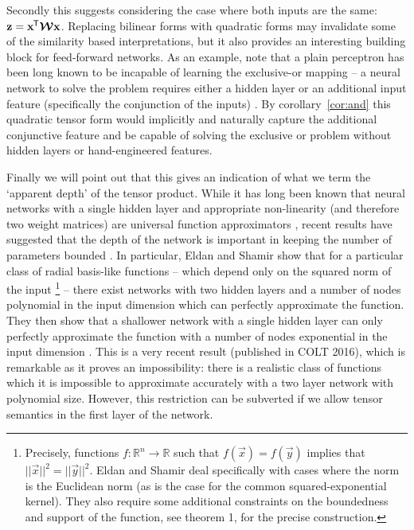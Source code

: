 Secondly this suggests considering
the case where both inputs are the same: \(\mathbf{z} = \mathbf{x}^{\mkern-1.5mu\mathsf{T}}\bm{\mathcal{W}}\mathbf{x}\). Replacing
bilinear forms with quadratic forms may invalidate some of the similarity based interpretations,
but it also provides an interesting building block for feed-forward networks. As an example,
note that a plain perceptron has been long known to be incapable of learning the exclusive-or
mapping \autocite{Minsky1969} -- a neural network to solve the problem requires either a hidden layer
or an additional input feature (specifically the conjunction of the inputs) \autocite{Rumelhart1986}.
By corollary~\ref{cor:and} this quadratic tensor form would implicitly and naturally capture the
additional conjunctive feature and be capable of solving the exclusive or problem without hidden
layers or hand-engineered features.

Finally we will point out that this gives an indication of what we term the `apparent depth' of the
tensor product. While it has long been known that neural networks with a single hidden layer and
appropriate non-linearity (and therefore two weight matrices)
 are universal function approximators \autocite{Hornik1989}, recent results
have suggested that the depth of the network is important in keeping the number of parameters
bounded \autocite{Eldan2016, Telgarsky2016}. In particular, Eldan and Shamir show that for a
particular class of radial basis-like functions -- which depend only on the squared norm of the 
input
\footnote{Precisely, functions \(f : \mathbb{R}^n \to \mathbb{R}\) such that
\(f(\vec{x}) = f(\vec{y})\) implies that \(||\vec{x}||^2 = ||\vec{y}||^2\). Eldan and Shamir
deal specifically with cases where the norm is the Euclidean norm (as is the case for the
common squared-exponential kernel). They also
require some additional constraints on the boundedness and support of the function, see
\autocite{Eldan2016} theorem 1, for the precise construction.} --
there exist networks with two hidden layers and a number of nodes polynomial in the input dimension
which can perfectly approximate the function. They then show that a shallower network with a single
hidden layer can only perfectly approximate the function with a number of nodes exponential in the
input dimension \autocite{Eldan2016}. This is a very recent result (published in COLT 2016), which
is remarkable as it proves an impossibility: there is a realistic class of functions which it is
impossible to approximate accurately with a two layer network with polynomial size. However,
this restriction can be subverted if we allow tensor semantics in the first layer of the network.

